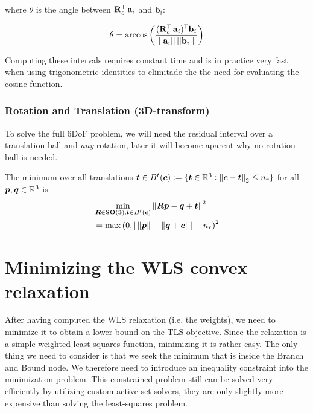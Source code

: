 where $\theta$ is the angle between $\mathbf{R}_c^{\mathsf{T}} \,\mathbf{a}_i$ and $\mathbf{b}_i$:

\begin{equation}
	\begin{aligned}
		\theta = \arccos \left( \frac{(\mathbf{R}_c^{\mathsf{T}} \, \mathbf{a}_i )^{\mathsf{T}} \mathbf{b}_i}{|| \mathbf{a}_i || \, || \mathbf{b}_i ||} \right)
	\end{aligned}
\end{equation}

Computing these intervals requires constant time and is in practice very fast when using trigonometric identities to elimitade the the need for evaluating the cosine function.

\subsubsection{Rotation and Translation (3D-transform)}

To solve the full 6DoF problem, we will need the residual interval over a translation ball and \textit{any} rotation, later it  will become aparent why no rotation ball is needed.

The minimum over all translations $\boldsymbol{t} \in B^t(\boldsymbol{c}) := \{\boldsymbol{t} \in \mathbb{R}^3: \left\| \boldsymbol{c} - \boldsymbol{t} \right\|_2 \leq n_r\}$ for all $\boldsymbol{p}, \boldsymbol{q} \in \mathbb{R}^3$ is
\begin{equation}
	\begin{aligned}
		&\min_{{\bm R} \in \mathbf{SO(3)}, \boldsymbol{t} \in B^t(\boldsymbol{c})} \left\|{\bm R} \boldsymbol{p} - \boldsymbol{q} + \boldsymbol{t}\right\|^2\\
		&= \max \left(  0, | \left\| \boldsymbol{p} \right\| - \left\| \boldsymbol{q} + \boldsymbol{c} \right\| | - n_r \right)^2
	\end{aligned}
\end{equation}

\section{Minimizing the WLS convex relaxation}
After having computed the WLS relaxation (i.e. the weights), we need to minimize it to obtain a lower bound on the TLS objective. 
Since the relaxation is a simple weighted least squares function, minimizing it is rather easy. The only thing we need to consider is that we seek the minimum that is inside the Branch and Bound node. We therefore need to introduce an inequality constraint into the minimization problem.
This constrained problem still can be solved very efficiently by utilizing custom active-set solvers, they are only slightly more expensive than solving the least-squares problem.

